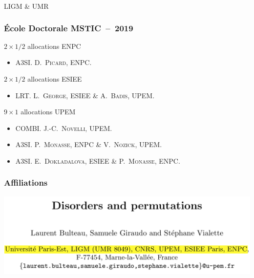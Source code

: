 \documentclass[]{beamer}
\begin{document}

\begin{frame}[label=points, standout]{}
  LIGM \& UMR
\end{frame}


\begin{frame}
  \frametitle{\'Ecole Doctorale MSTIC~--~2019}

  \begin{block}{$2 \times 1/2$ allocations ENPC}
    \begin{itemize}
      \item
      A3SI. \textsc{D.~Picard}, ENPC.
    \end{itemize}
  \end{block}

  \medskip

  \begin{block}{$2 \times 1/2$ allocations ESIEE}
    \begin{itemize}
      \item
      LRT. \textsc{L.~George}, ESIEE \& \textsc{A.~Badis}, UPEM.
    \end{itemize}
  \end{block}

  \medskip

  \begin{block}{$9 \times 1$ allocations UPEM}
    \begin{itemize}
      \item
      COMBI. \textsc{J.-C.~Novelli}, UPEM.
      \item
      A3SI. \textsc{P.~Monasse}, ENPC \& \textsc{V.~Nozick}, UPEM.
      \item
      A3SI. \textsc{E.~Dokladalova}, ESIEE \& \textsc{P.~Monasse}, ENPC.
    \end{itemize}
  \end{block}

\end{frame}


\begin{frame}
  \frametitle{Affiliations}

  \begin{center}
    \includegraphics[scale=.355]{pictures/disorders-permutations}
  \end{center}
\end{frame}
\end{document}
